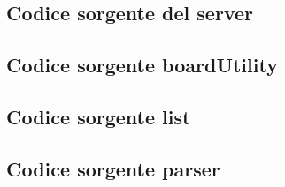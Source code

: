 \documentclass[a4paper]{article}
\begin{document}
\subsection{Codice sorgente del server}

\subsection{Codice sorgente boardUtility}


\subsection{Codice sorgente list}


\subsection{Codice sorgente parser}


\pagebreak
\lstlistoflistings
\end{document}
